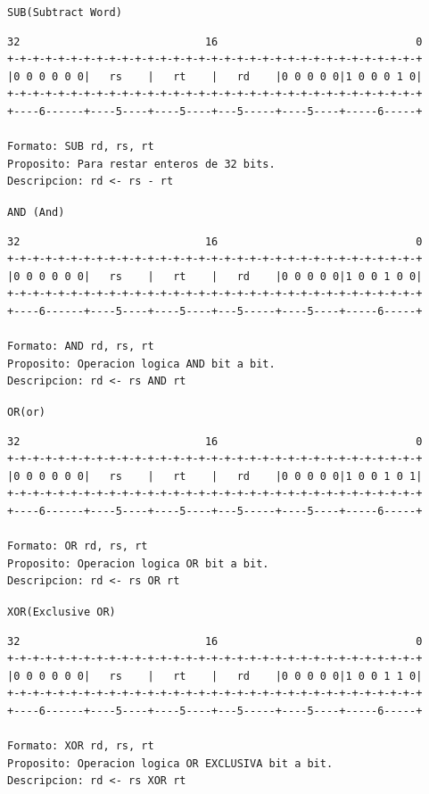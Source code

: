 \texttt{SUB(Subtract Word)}

\begin{lstlisting}[style=consola]
32                             16                               0
+-+-+-+-+-+-+-+-+-+-+-+-+-+-+-+-+-+-+-+-+-+-+-+-+-+-+-+-+-+-+-+-+
|0 0 0 0 0 0|   rs    |   rt    |   rd    |0 0 0 0 0|1 0 0 0 1 0|
+-+-+-+-+-+-+-+-+-+-+-+-+-+-+-+-+-+-+-+-+-+-+-+-+-+-+-+-+-+-+-+-+
+----6------+----5----+----5----+---5-----+----5----+-----6-----+

Formato: SUB rd, rs, rt
Proposito: Para restar enteros de 32 bits.
Descripcion: rd <- rs - rt
\end{lstlisting}

\texttt{AND (And)}

\begin{lstlisting}[style=consola]
32                             16                               0
+-+-+-+-+-+-+-+-+-+-+-+-+-+-+-+-+-+-+-+-+-+-+-+-+-+-+-+-+-+-+-+-+
|0 0 0 0 0 0|   rs    |   rt    |   rd    |0 0 0 0 0|1 0 0 1 0 0|
+-+-+-+-+-+-+-+-+-+-+-+-+-+-+-+-+-+-+-+-+-+-+-+-+-+-+-+-+-+-+-+-+
+----6------+----5----+----5----+---5-----+----5----+-----6-----+

Formato: AND rd, rs, rt
Proposito: Operacion logica AND bit a bit.
Descripcion: rd <- rs AND rt
\end{lstlisting}

\texttt{OR(or)}

\begin{lstlisting}[style=consola]
32                             16                               0
+-+-+-+-+-+-+-+-+-+-+-+-+-+-+-+-+-+-+-+-+-+-+-+-+-+-+-+-+-+-+-+-+
|0 0 0 0 0 0|   rs    |   rt    |   rd    |0 0 0 0 0|1 0 0 1 0 1|
+-+-+-+-+-+-+-+-+-+-+-+-+-+-+-+-+-+-+-+-+-+-+-+-+-+-+-+-+-+-+-+-+
+----6------+----5----+----5----+---5-----+----5----+-----6-----+

Formato: OR rd, rs, rt
Proposito: Operacion logica OR bit a bit.
Descripcion: rd <- rs OR rt
\end{lstlisting}

\texttt{XOR(Exclusive OR)}

\begin{lstlisting}[style=consola]
32                             16                               0
+-+-+-+-+-+-+-+-+-+-+-+-+-+-+-+-+-+-+-+-+-+-+-+-+-+-+-+-+-+-+-+-+
|0 0 0 0 0 0|   rs    |   rt    |   rd    |0 0 0 0 0|1 0 0 1 1 0|
+-+-+-+-+-+-+-+-+-+-+-+-+-+-+-+-+-+-+-+-+-+-+-+-+-+-+-+-+-+-+-+-+
+----6------+----5----+----5----+---5-----+----5----+-----6-----+

Formato: XOR rd, rs, rt
Proposito: Operacion logica OR EXCLUSIVA bit a bit.
Descripcion: rd <- rs XOR rt
\end{lstlisting}

